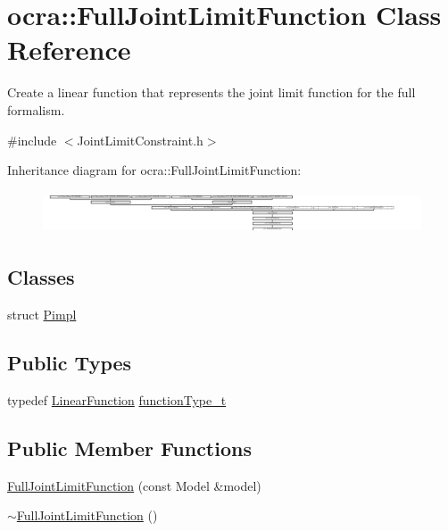 \hypertarget{classocra_1_1FullJointLimitFunction}{}\section{ocra\+:\+:Full\+Joint\+Limit\+Function Class Reference}
\label{classocra_1_1FullJointLimitFunction}


Create a linear function that represents the joint limit function for the full formalism.  




{\ttfamily \#include $<$Joint\+Limit\+Constraint.\+h$>$}

Inheritance diagram for ocra\+:\+:Full\+Joint\+Limit\+Function\+:\begin{figure}[H]
\begin{center}
\leavevmode
\includegraphics[height=1.262480cm]{df/d42/classocra_1_1FullJointLimitFunction}
\end{center}
\end{figure}
\subsection*{Classes}
\begin{DoxyCompactItemize}
\item 
struct \hyperlink{structFullJointLimitFunction_1_1Pimpl}{Pimpl}
\end{DoxyCompactItemize}
\subsection*{Public Types}
\begin{DoxyCompactItemize}
\item 
typedef \hyperlink{classocra_1_1LinearFunction}{Linear\+Function} \hyperlink{classocra_1_1FullJointLimitFunction_a3ae743a316981d67933248a9d58f58fb}{function\+Type\+\_\+t}
\end{DoxyCompactItemize}
\subsection*{Public Member Functions}
\begin{DoxyCompactItemize}
\item 
\hyperlink{classocra_1_1FullJointLimitFunction_af49c77d067fe584cf6d3884eb33b2ed0}{Full\+Joint\+Limit\+Function} (const Model \&model)
\item 
\hyperlink{classocra_1_1FullJointLimitFunction_a84cc9b5e7efdf78fe9a279ef5940871b}{$\sim$\+Full\+Joint\+Limit\+Function} ()
\end{DoxyCompactItemize}
